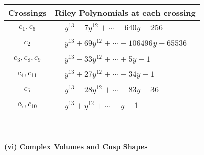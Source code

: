 \documentclass[1p]{elsarticle_modified}
\theoremstyle{definition}
\begin{document}
\begin{tabular}{m{50pt}|m{274pt}}
Crossings & \hspace{64pt}Riley Polynomials at each crossing \\
\hline $$\begin{aligned}c_{1},c_{6}\end{aligned}$$&$\begin{aligned}
&y^{13}-7 y^{12}+\cdots-640 y-256
\end{aligned}$\\
\hline $$\begin{aligned}c_{2}\end{aligned}$$&$\begin{aligned}
&y^{13}+69 y^{12}+\cdots-106496 y-65536
\end{aligned}$\\
\hline $$\begin{aligned}c_{3},c_{8},c_{9}\end{aligned}$$&$\begin{aligned}
&y^{13}-33 y^{12}+\cdots+5 y-1
\end{aligned}$\\
\hline $$\begin{aligned}c_{4},c_{11}\end{aligned}$$&$\begin{aligned}
&y^{13}+27 y^{12}+\cdots-34 y-1
\end{aligned}$\\
\hline $$\begin{aligned}c_{5}\end{aligned}$$&$\begin{aligned}
&y^{13}-28 y^{12}+\cdots-83 y-36
\end{aligned}$\\
\hline $$\begin{aligned}c_{7},c_{10}\end{aligned}$$&$\begin{aligned}
&y^{13}+y^{12}+\cdots- y-1
\end{aligned}$\\
\hline
\end{tabular}\\~\\
\newpage\flushleft \textbf{(vi) Complex Volumes and Cusp Shapes}
\end{document}
